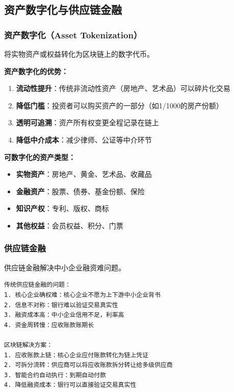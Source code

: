 ﻿\documentclass[12pt,a4paper]{article}
\begin{document}
\subsection{资产数字化与供应链金融}

\subsubsection{资产数字化（Asset Tokenization）}

将实物资产或权益转化为区块链上的数字代币。

\begin{theorybox}
\textbf{资产数字化的优势：}
\begin{enumerate}
\item \textbf{流动性提升}：传统非流动性资产（房地产、艺术品）可以碎片化交易
\item \textbf{降低门槛}：投资者可以购买资产的一部分（如1/1000的房产份额）
\item \textbf{透明可追溯}：资产所有权变更全程记录在链上
\item \textbf{降低中介成本}：减少律师、公证等中介环节
\end{enumerate}
\end{theorybox}

\textbf{可数字化的资产类型：}
\begin{itemize}[leftmargin=1.5em]
\item \textbf{实物资产}：房地产、黄金、艺术品、收藏品
\item \textbf{金融资产}：股票、债券、基金份额、保险
\item \textbf{知识产权}：专利、版权、商标
\item \textbf{其他权益}：会员权益、积分、门票
\end{itemize}

\subsubsection{供应链金融}

供应链金融解决中小企业融资难问题。

\begin{lstlisting}
传统供应链金融的问题：
1. 核心企业确权难：核心企业不愿为上下游中小企业背书
2. 信息不对称：银行难以验证交易真实性
3. 融资成本高：中小企业信用不足，利率高
4. 资金周转慢：应收账款账期长

区块链解决方案：
1. 应收账款上链：核心企业应付账款转化为链上凭证
2. 可拆分流转：供应商可以将应收账款拆分转让给多级供应商
3. 智能合约自动执行：到期自动付款
4. 降低融资成本：银行可以直接验证交易真实性
\end{lstlisting}
\end{document}

